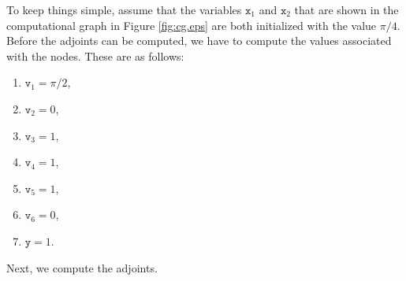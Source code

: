 \example
To keep things simple, assume that the variables $\mathtt{x}_1$ and $\mathtt{x}_2$ that are shown in the
computational graph in Figure \ref{fig:cg.eps} are both initialized with the value $\pi/4$.
Before the adjoints can be computed, we have to compute the values associated with the nodes.
These are as follows:
\begin{enumerate}
\item $\mathtt{v}_1 = \pi/2$,
\item $\mathtt{v}_2 = 0$,
\item $\mathtt{v}_3 = 1$,
\item $\mathtt{v}_4 = 1$,
\item $\mathtt{v}_5 = 1$,
\item $\mathtt{v}_6 = 0$,
\item $\mathtt{y} = 1$.
\end{enumerate}
Next, we compute the adjoints.

